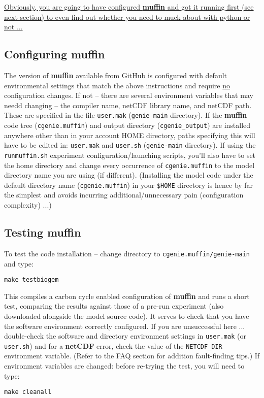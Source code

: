 \documentclass[11pt,fleqn]{book} %
\begin{document}
\vspace{4pt}
\noindent\uline{Obviously, you are going to have configured \textbf{muffin} and got it running first (see next section) to even find out whether you need to muck about with python or not ...}

%
\subsection*{Configuring muffin}

The version of \textbf{muffin} available from GitHub is configured with default environmental settings that match the above instructions and require \uline{no} configuration changes. If not -- there are several  environment variables that may needd changing -- the compiler name, netCDF library name, and netCDF path. These are specified in the file \texttt{user.mak} (\texttt{genie-main} directory). If the \textbf{muffin} code tree (\texttt{cgenie.muffin}) and output directory (\texttt{cgenie\_output}) are installed anywhere other than in your account HOME directory, paths specifying this will have to be edited in: \texttt{user.mak} and \texttt{user.sh} (\texttt{genie-main} directory). If using the \texttt{runmuffin.sh} experiment configuration/launching scripts, you'll also have to set the home directory  and change every occurrence of \texttt{cgenie.muffin} to the model directory name you are using (if different). (Installing the model code under the default directory name (\texttt{cgenie.muffin}) in your \texttt{\$HOME} directory is hence by far the simplest and avoids incurring additional/unnecessary pain (configuration complexity) ...)

%
\subsection*{Testing muffin}

To test the code installation -- change directory to \texttt{cgenie.muffin/genie-main} and type:
\vspace{-5pt}\begin{verbatim}
make testbiogem
\end{verbatim}\vspace{-5pt}
This compiles a carbon cycle enabled configuration of \textbf{muffin} and runs a short test, comparing the results against those of a pre-run experiment (also downloaded alongside the model source code). It serves to check that you have the software environment correctly configured. If you are unsuccessful here ... double-check the software and directory environment settings in \texttt{user.mak} (or \texttt{user.sh}) and for a \textbf{netCDF} error, check the value of the \texttt{NETCDF\_DIR} environment variable. (Refer to the FAQ section for addition fault-finding tips.) If environment variables are changed: before re-trying the test, you will need to type:
\vspace{-5pt}\begin{verbatim}
make cleanall
\end{verbatim}\vspace{-5pt}
\end{document}
